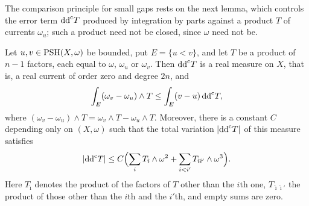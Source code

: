 The comparison principle for small gaps rests on the next lemma, which controls the error term $\mathrm{dd}^{\mathrm{c}} T$ produced by integration by parts against a product $T$ of currents $\omega_u$; such a product need not be closed, since $\omega$ need not be.

\begin{lemma}\label{lem:hermitian-one-factor-comparison}
Let $u,v\in\mathrm{PSH}(X,\omega)$ be bounded, put $E=\{u<v\}$, and let $T$ be a product of $n-1$ factors, each equal to $\omega$, $\omega_u$ or $\omega_v$. Then $\mathrm{dd}^{\mathrm{c}} T$ is a real measure on $X$, that is, a real current of order zero and degree $2n$, and
\begin{equation}\label{eq:hermitian-one-factor-comparison}
 \int_E(\omega_v-\omega_u)\wedge T
       \leq\int_E(v-u)\,\mathrm{dd}^{\mathrm{c}} T,
\end{equation}
where $(\omega_v-\omega_u)\wedge T=\omega_v\wedge T-\omega_u\wedge T$. Moreover, there is a constant $C$ depending only on $(X,\omega)$ such that the total variation $|\mathrm{dd}^{\mathrm{c}} T|$ of this measure satisfies
\begin{equation}\label{eq:hermitian-ddc-product-variation}
 |\mathrm{dd}^{\mathrm{c}} T|\leq C\Bigl(\sum_iT_{\hat\imath}\wedge\omega^2+\sum_{i<i'}T_{\hat\imath\hat\imath'}\wedge\omega^3\Bigr).
\end{equation}
Here $T_{\hat\imath}$ denotes the product of the factors of $T$ other than the $i$th one, $T_{\hat\imath\hat\imath'}$ the product of those other than the $i$th and the $i'$th, and empty sums are zero.
\end{lemma}
